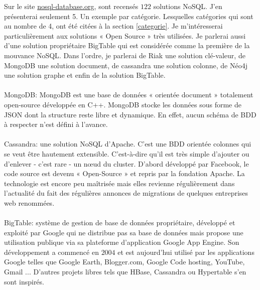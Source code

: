 Sur le site \url{nosql-database.org}, sont recensés $122$
solutions \textsf{NoSQL}.  J'en présenterai seulement 5. Un exemple
par catégorie. Lesquelles catégories qui sont au nombre de 4, ont été
citées à la section \ref{categorie}. Je m'intéresserai
particulièrement aux solutions « \textsf{Open Source} » très
utilisées. Je parlerai aussi d'une solution
propriétaire \textsf{BigTable} qui est considérée comme la première de
la mouvance \textsf{NoSQL}. Dans l'ordre, je parlerai de \textsf{Riak} une solution \textsf{clé-valeur}, de \textsf{MongoDB} une solution \textsf{document}, de \textsf{cassandra} une solution \textsf{colonne}, de \textsf{Néo4j} une solution \textsf{graphe} et enfin de la solution \textsf{BigTable}.
\\
\\ 
{\sf MongoDB}: MongoDB est une base de données « \textsf{orientée
    document} » totalement open-source développée en
\textsf{C++}. MongoDB stocke les données sous forme de \textsf{JSON}
dont la structure reste libre et dynamique.  En effet, aucun schéma de
\textsf{BDD} à respecter n'est défini à
l'avance.\cite{mongoDB} 
\\
\\ 
\textsf{Cassandra}:  une
solution \textsf{NoSQL} d’\textsf{Apache}.  C’est une \textsf{BDD}
orientée colonnes qui se veut être hautement extensible. C’est-à-dire
qu’il est très simple d’ajouter ou d’enlever - c’est rare - un nœud du
cluster. D’abord développé par \textsf{Facebook}, le code source est
devenu « \textsf{Open-Source} » et repris par la
fondation \textsf{Apache}\cite{cassandra}.  La technologie est encore
peu maîtrisée mais elles revienne régulièrement dans l’actualité du
fait des régulières annonces de migrations de quelques
entreprises \textsf{web} renommées\cite{cassandra2}.
\\
\\ 
\textsf{BigTable}:  système de gestion de base de
données propriétaire, développé et exploité par Google qui ne
distribue pas sa base de données mais propose une utilisation publique
via sa plateforme d'application \textsf{Google App Engine}. Son
développement a commencé en $2004$ et est aujourd'hui utilisé par les
applications \textsf{Google} telles que \textsf{Google Earth},
\textsf{Blogger.com}, \textsf{Google Code hosting}, \textsf{YouTube},
\textsf{Gmail} ... D'autres projets libres tels que \textsf{HBase},
\textsf{Cassandra} ou \textsf{Hypertable} s'en sont
inspirés.
